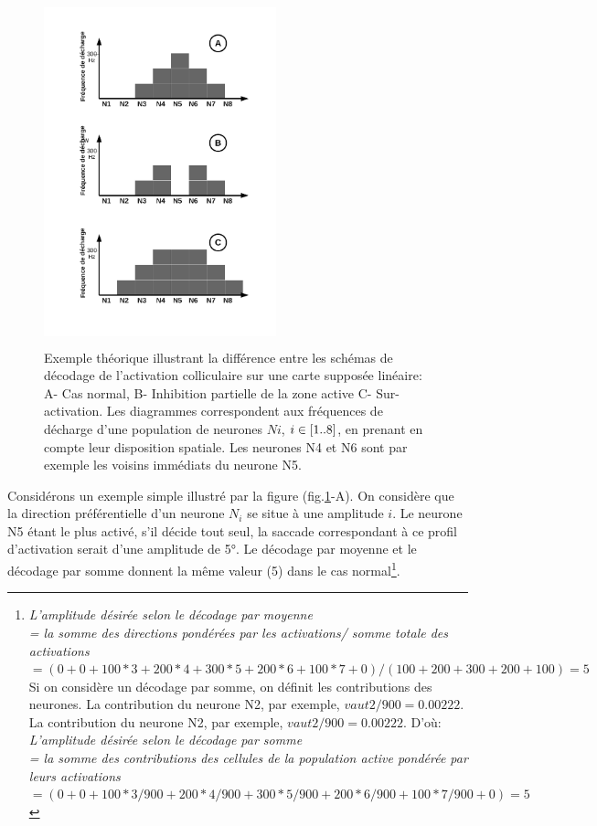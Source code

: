 \begin{figure}[ht]
  \begin{center}
    \includegraphics[width=0.6\textwidth,height=10cm]{figures/ch3_2_sum-average}
  \end{center}
  \caption{ Exemple théorique illustrant la différence entre les schémas de décodage de l'activation colliculaire sur une carte supposée linéaire: A- Cas normal, B- Inhibition partielle de la zone active C- Sur-activation. Les diagrammes correspondent aux fréquences de décharge d'une population de neurones $Ni$, $i\protect\in[1..8]$, en prenant en compte leur disposition spatiale. Les neurones N4 et N6 sont par exemple les voisins immédiats du neurone N5.}
  \label{sumav}
\end{figure}

Considérons un exemple simple illustré par la figure (fig.\ref{sumav}-A). On considère que la direction préférentielle d'un neurone $N_i$ se situe à une amplitude $i$. Le neurone N5 étant le plus activé, s'il décide tout seul, la saccade correspondant à ce profil d'activation serait d'une amplitude de 5°. Le décodage par moyenne et le décodage par somme donnent la même valeur (5) dans le cas normal\footnote{
\textit{L'amplitude désirée selon le décodage par moyenne}\\
\textit{= la somme des directions pondérées par les activations/ somme totale des activations }\\
                     $=(0+0+100*3+200*4+300*5+200*6+100*7+0)/(100+200+300+200+100)=5$\\

Si on considère un décodage par somme, on définit les contributions des neurones. La contribution du neurone N2, par exemple, $vaut 2/900=0.00222$. La contribution du neurone N2, par exemple, $vaut 2/900=0.00222$. D'o\`u:\\

\textit{L'amplitude désirée selon le décodage par somme}\\
\textit{= la somme des contributions des cellules de la population active pondérée par leurs activations}\\
                     $=(0+0+100*3/900+200*4/900+300*5/900+200*6/900+100*7/900+0)=5$\\}.\\

